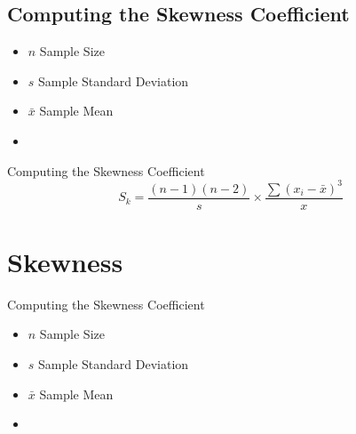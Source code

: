 \documentclass[]{report}
\begin{document}
\subsection{Computing the Skewness Coefficient}


\begin{itemize}
	\item $n$ Sample Size
	\item $s$ Sample Standard Deviation
	\item $\bar{x}$ Sample Mean
	\item
\end{itemize}



Computing the Skewness Coefficient
{
	\LARGE
	\[S_k = \frac{(n-1)(n-2)}{s} \times \frac{ \sum(x_i - \bar{x})^3 }{ x} \] 
}





\section{Skewness}
Computing the Skewness Coefficient


\begin{itemize}
	\item $n$ Sample Size
	\item $s$ Sample Standard Deviation
	\item $\bar{x}$ Sample Mean
	\item
\end{itemize}
\end{document}
